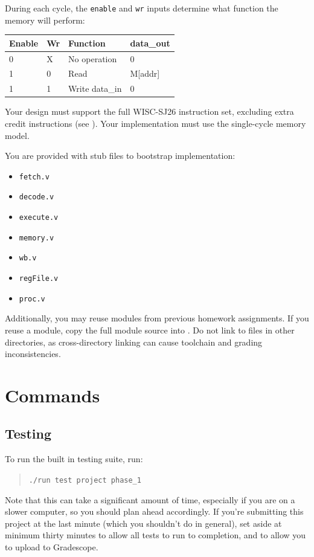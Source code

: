 \documentclass[12pt]{article}
\begin{document}
During each cycle, the \texttt{enable} and \texttt{wr} inputs determine what function the memory will perform:

\begin{center}
\begin{tabular}{|l|l|l|l|} \hline
Enable & Wr & Function & data\_out \\ \hline
0 & X & No operation & 0 \\ \hline
1 & 0 & Read & M[addr] \\ \hline
1 & 1 & Write data\_in & 0 \\ \hline
\end{tabular}
\end{center}

Your design must support the full WISC-SJ26 instruction set, excluding extra credit instructions (see ). Your implementation must use the single-cycle memory model.

You are provided with stub files to bootstrap implementation:
\begin{itemize}
\item \texttt{fetch.v}
\item \texttt{decode.v}
\item \texttt{execute.v}
\item \texttt{memory.v}
\item \texttt{wb.v}
\item \texttt{regFile.v}
\item \texttt{proc.v}
\end{itemize}

Additionally, you may reuse modules from previous homework assignments. If you reuse a module, copy the full module source into . Do not link to files in other directories, as cross-directory linking can cause toolchain and grading inconsistencies.

\section*{Commands}
\subsection*{Testing}
To run the built in testing suite, run:
\begin{quote}
\texttt{./run test project phase\_1}
\end{quote}
Note that this can take a significant amount of time, especially if you are on a slower computer, so you should plan ahead accordingly. If you're submitting this project at the last minute (which you shouldn't do in general), set aside at minimum thirty minutes to allow all tests to run to completion, and to allow you to upload to Gradescope.
\end{document}
